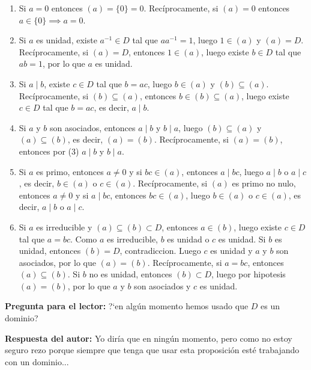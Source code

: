 \begin{proofbox}

\begin{enumerate}
    \item Si \(a = 0\) entonces \((a) = \{0\} = 0\). Recíprocamente, si \((a) = 0\) entonces \(a \in \{0\} \implies a = 0\).

    \item Si \(a\) es unidad, existe \(a^{-1} \in D\) tal que \(aa^{-1} = 1\), luego \(1 \in (a)\) y \((a) = D\). Recíprocamente, si \((a) = D\), entonces \(1 \in (a)\), luego existe \(b \in D\) tal que \(ab = 1\), por lo que \(a\) es unidad.

    \item Si \(a \mid b\), existe \(c \in D\) tal que \(b = ac\), luego \(b \in (a)\) y \((b) \subseteq (a)\). Recíprocamente, si \((b) \subseteq (a)\), entonces \(b \in (b) \subseteq (a)\), luego existe \(c \in D\) tal que \(b = ac\), es decir, \(a \mid b\).

    \item Si \(a\) y \(b\) son asociados, entonces \(a \mid b\) y \(b \mid a\), luego \((b) \subseteq (a)\) y \((a) \subseteq (b)\), es decir, \((a) = (b)\). Recíprocamente, si \((a) = (b)\), entonces por (3) \(a \mid b\) y \(b \mid a\).

    \item Si \(a\) es primo, entonces \(a \neq 0\) y si \(bc \in (a)\), entonces \(a \mid bc\), luego \(a \mid b\) o \(a \mid c\), es decir, \(b \in (a)\) o \(c \in (a)\). Recíprocamente, si \((a)\) es primo no nulo, entonces \(a \neq 0\) y si \(a \mid bc\), entonces \(bc \in (a)\), luego \(b \in (a)\) o \(c \in (a)\), es decir, \(a \mid b\) o \(a \mid c\).

    \item Si \(a\) es irreducible y \((a) \subseteq (b) \subset D\), entonces \(a \in (b)\), luego existe \(c \in D\) tal que \(a = bc\). Como \(a\) es irreducible, \(b\) es unidad o \(c\) es unidad. Si \(b\) es unidad, entonces \((b) = D\), contradiccion. Luego \(c\) es unidad y \(a\) y \(b\) son asociados, por lo que \((a) = (b)\). Recíprocamente, si \(a = bc\), entonces \((a) \subseteq (b)\). Si \(b\) no es unidad, entonces \((b) \subset D\), luego por hipotesis \((a) = (b)\), por lo que \(a\) y \(b\) son asociados y \(c\) es unidad.
\end{enumerate}

\end{proofbox}

\begin{remark}
    \textbf{Pregunta para el lector:} ?`en algún momento hemos usado que $D$ es un dominio?
    
    \noindent\textbf{Respuesta del autor:} Yo diría que en ningún momento, pero como no estoy seguro rezo porque siempre que tenga que usar esta proposición esté trabajando con un dominio...
\end{remark}

